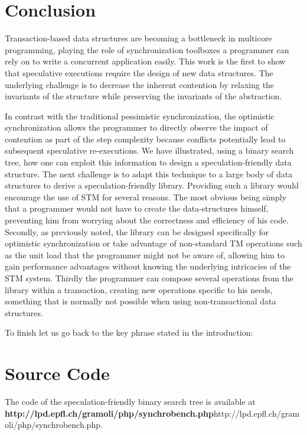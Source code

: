 \section{Conclusion}\label{sec:conclusion}

Transaction-based data structures are becoming a bottleneck in multicore programming,
playing the role of synchronization toolboxes a programmer can rely on to write 
a concurrent application easily.
This work is the first to show that speculative executions require the design of new data structures.
The underlying challenge is to decrease the inherent contention by relaxing the invariants of the structure
while preserving the invariants of the abstraction.

In contrast with the traditional pessimistic synchronization, the optimistic synchronization allows the programmer
to directly observe the impact of contention as part of the step complexity because conflicts potentially lead to subsequent speculative re-executions.
We have illustrated, using a binary search tree, how one can exploit this information
to design a speculation-friendly data structure.
The next challenge is to
adapt this technique to a large body of data structures to derive a speculation-friendly library.
Providing such a library would encourage the use of STM for several reasons.
The most obvious being simply that a programmer would not have to create the data-structures himself,
preventing him from worrying about the correctness and efficiency of his code.
Secondly, as previously noted, the library can be designed specifically for optimistic synchronization or take advantage of
non-standard TM operations such as the unit load that the programmer might not be aware of, allowing him to
gain performance advantages without knowing the underlying intricacies of the STM system.
Thirdly the programmer can compose several operations from the library within a transaction, creating
new operations specific to his needs, something that is normally not possible when using non-transactional data structures.

To finish let us go back to the key phrase stated in the introduction:


\section*{Source Code}
The code of the speculation-friendly binary search tree is available at {\bf http://lpd.epfl.ch/gramoli/php/synchrobench.php}{http://lpd.epfl.ch/gramoli/php/synchrobench.php}.

% 
% 
% 
% 
% 

